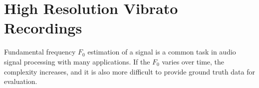 
\section{High Resolution Vibrato Recordings}%
\label{sec:muserc}


Fundamental frequency \(F_0\) estimation of a signal is a common task in audio signal processing with many applications. 
If the $F_0$ varies over time, the complexity increases, and it is also more difficult to provide ground truth data for evaluation.

